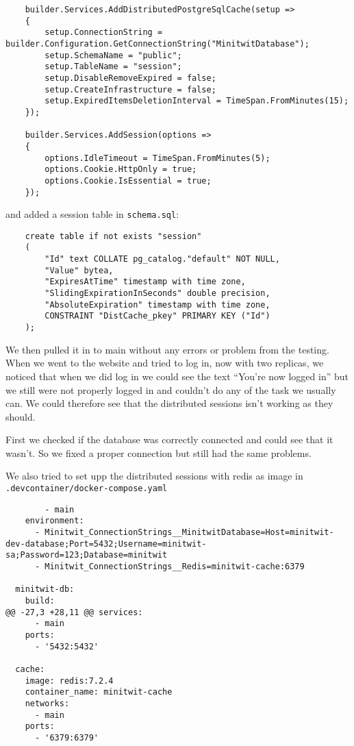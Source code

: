 \begin{verbatim}
    builder.Services.AddDistributedPostgreSqlCache(setup =>
    {
        setup.ConnectionString = builder.Configuration.GetConnectionString("MinitwitDatabase");
        setup.SchemaName = "public";
        setup.TableName = "session";
        setup.DisableRemoveExpired = false;
        setup.CreateInfrastructure = false;
        setup.ExpiredItemsDeletionInterval = TimeSpan.FromMinutes(15);
    });

    builder.Services.AddSession(options =>
    {
        options.IdleTimeout = TimeSpan.FromMinutes(5);
        options.Cookie.HttpOnly = true;
        options.Cookie.IsEssential = true;
    });
\end{verbatim}

and added a session table in \texttt{schema.sql}:
\begin{verbatim}
    create table if not exists "session"
    (
        "Id" text COLLATE pg_catalog."default" NOT NULL,
        "Value" bytea,
        "ExpiresAtTime" timestamp with time zone,
        "SlidingExpirationInSeconds" double precision,
        "AbsoluteExpiration" timestamp with time zone,
        CONSTRAINT "DistCache_pkey" PRIMARY KEY ("Id")
    );
\end{verbatim}

We then pulled it in to main without any errors or problem from the testing. When we went to the website and tried to log in, now with two replicas, we noticed that when we did log in we could see the text ``You're now logged in'' but we still were not properly logged in and couldn't do any of the task we usually can. We could therefore see that the distributed sessions isn't working as they should.

First we checked if the database was correctly connected and could see that it wasn't. So we fixed a proper connection but still had the same problems.

We also tried to set upp the distributed sessions with redis as image in \texttt{.devcontainer/docker-compose.yaml}

\begin{verbatim}
        - main
    environment:
      - Minitwit_ConnectionStrings__MinitwitDatabase=Host=minitwit-dev-database;Port=5432;Username=minitwit-sa;Password=123;Database=minitwit
      - Minitwit_ConnectionStrings__Redis=minitwit-cache:6379

  minitwit-db:
    build:
@@ -27,3 +28,11 @@ services:
      - main
    ports:
      - '5432:5432'

  cache:
    image: redis:7.2.4
    container_name: minitwit-cache
    networks:
      - main
    ports:
      - '6379:6379'
\end{verbatim}

